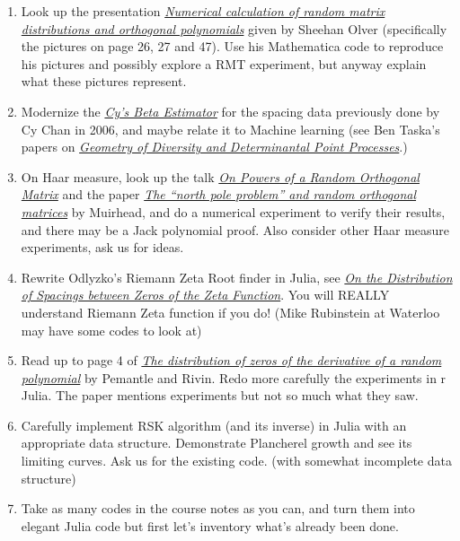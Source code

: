 \documentclass{article}
\begin{document}
\begin{enumerate}
    \item Look up the presentation \href{http://www.maths.usyd.edu.au/u/olver/talks/RandomMatrix.pdf}{\emph{\color{blue}Numerical calculation of random matrix distributions and orthogonal polynomials}} given by Sheehan Olver (specifically the pictures on page 26, 27 and 47). Use his Mathematica code to reproduce his pictures and possibly explore a RMT experiment, but anyway explain what these pictures represent.
    \item Modernize the \href{http://people.csail.mit.edu/cychan/BetaEstimator.html}{\emph{\color{blue}Cy's Beta Estimator}} for the spacing data previously done by Cy Chan in 2006, and maybe relate it to Machine learning (see Ben Taska's papers on \href{http://www.seas.upenn.edu/~taskar/}{\emph{\color{blue}Geometry of Diversity and Determinantal Point Processes}}.)
    \item On Haar measure, look up the talk \href{http://web.mit.edu/sea06/agenda/talks/Muirhead.pdf}{\emph{\color{blue}On Powers of a Random Orthogonal Matrix}} and the paper \href{http://arxiv.org/abs/0811.2678}{\emph{\color{blue}The ``north pole problem'' and random orthogonal matrices}} by Muirhead, and do a numerical experiment to verify their results, and there may be a Jack polynomial proof. Also consider other Haar measure experiments, ask us for ideas.
    \item Rewrite Odlyzko's Riemann Zeta Root finder in Julia, see \href{http://www.dtc.umn.edu/~odlyzko/doc/arch/zeta.zero.spacing.pdf}{\emph{\color{blue}On the Distribution of Spacings between Zeros of the Zeta Function}}. You will REALLY understand Riemann Zeta function if you do! (Mike Rubinstein at Waterloo may have some codes to look at)
    \item Read up to page 4 of \href{http://www.math.upenn.edu/~pemantle/papers/Preprints/zeros.pdf}{\emph{\color{blue}The distribution of zeros of the derivative of a random polynomial}} by Pemantle and Rivin. Redo more carefully the experiments in r Julia. The paper mentions experiments but not so much what they saw.
    \item Carefully implement RSK algorithm (and its inverse) in Julia with an appropriate data structure. Demonstrate Plancherel growth and see its limiting curves. Ask us for the existing code. (with somewhat incomplete data structure)
    \item{Take as many codes in the course notes as you can, and turn them into elegant Julia code but first let's inventory what's already been done.}
\end{enumerate}
\end{document}

